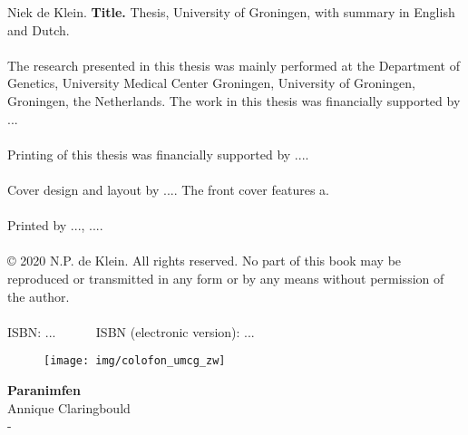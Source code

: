 \clearpage
{}

\restoregeometry
\clearpage

{\small
\noindent
Niek de Klein. \textbf{Title.} Thesis, University of Groningen, with summary in English and Dutch.
\\~\\
The research presented in this thesis was mainly performed at the Department of Genetics, University Medical Center Groningen, University of Groningen, Groningen, the Netherlands. The work in this thesis was financially supported by ...
\\~\\
Printing of this thesis was financially supported by ....
\\~\\
Cover design and layout by ....
The front cover features a.
\\~\\
Printed by ..., ....\\
\\
© 2020 N.P. de Klein. All rights reserved. No part of this book may be reproduced or transmitted in any form or by any means without permission of the author.\\
\\
ISBN: ... \mbox{~~~~~} ISBN (electronic version): ...
}

\begin{figure}[!htbp]
  \centering
  \begin{minipage}[b]{0.19\textwidth}
  \end{minipage}
  \hfill
  \begin{minipage}[b]{0.24\textwidth}
    \texttt{[image: img/colofon\_umcg\_zw]}
  \end{minipage}
  \hfill
  \begin{minipage}[b]{0.29\textwidth}
  \end{minipage}
\end{figure}

\clearpage



\clearpage

\noindent
\textbf{Paranimfen}\\
Annique Claringbould\\
-